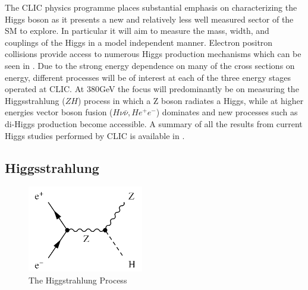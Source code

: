 The CLIC physics programme places substantial emphasis on characterizing the Higgs boson as it presents a new and relatively less well measured sector of the \ac{SM} to explore. In particular it will aim to measure the mass, width, and couplings of the Higgs in a model independent manner. Electron positron collisions provide access to numerous Higgs production mechanisms which can be seen in . Due to the strong energy dependence on many of the cross sections on energy, different processes will be of interest at each of the three energy stages operated at CLIC. At 380GeV the focus will predominantly be on measuring the Higgsstrahlung ($ZH$) process in which a Z boson radiates a Higgs, while at higher energies vector boson fusion ($H\nu\bar{\nu},He^{+}e^{-}$) dominates and new processes such as di-Higgs production become accessible. A summary of all the results from current Higgs studies performed by CLIC is available in \cite{Abramowicz:2016zbo}.

\subsection{Higgsstrahlung}

\begin{figure}
  \centering
  \includegraphics[width=0.45\textwidth,keepaspectratio]{Theory/fig/HiggsStrahlung.png}
  \caption[The Higgstrahlung Process]{The Higgstrahlung Process}
  \label{fig:higgsstrahlung}
\end{figure}


